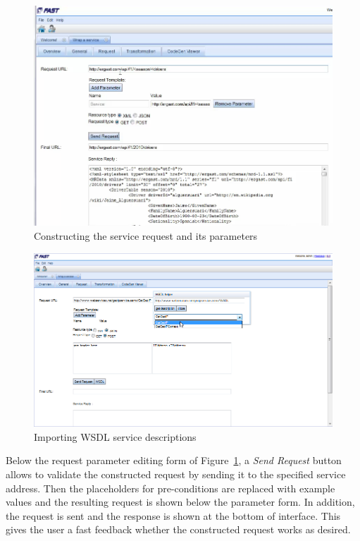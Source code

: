 \documentclass{fast_latex}
\begin{document}
\begin{figure}
  \begin{center}
    \includegraphics[width=\linewidth]{images/ServiceWrapperToolGVSRequestTemplate.png}
    \caption{Constructing the service request and its parameters}
    \label{fig:construct_service_request}
  \end{center}
\end{figure}

\begin{figure}
  \begin{center}
    \includegraphics[width=\linewidth]{images/ServiceWrapperToolGVSRequestTemplateWSDL.png}
    \caption{Importing WSDL service descriptions}
    \label{fig:construct_service_request_wsdl}
  \end{center}
\end{figure}

Below the request parameter editing form of Figure~\ref{fig:construct_service_request}, a \emph{Send Request} button allows to validate the constructed request by sending it to the specified service address. Then the placeholders for pre-conditions are replaced with example values and the resulting request is shown below the parameter form. In addition, the request is sent and the response is shown at the bottom of interface. This gives the user a fast feedback whether the constructed request works as desired. 
\end{document}
